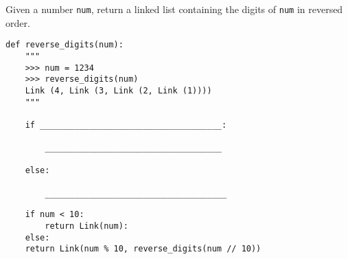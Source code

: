 \begin{blocksection}
\question Given a number \texttt{num}, return a linked list containing the digits of \texttt{num} in reversed order. 

\begin{lstlisting}
def reverse_digits(num):
    """
    >>> num = 1234
    >>> reverse_digits(num)
    Link (4, Link (3, Link (2, Link (1)))) 
    """

    if _____________________________________:
    
        ____________________________________
        
    else:
    
        _____________________________________
\end{lstlisting}
\begin{solution}[0.6in]
\begin{lstlisting}
    if num < 10:
        return Link(num):
    else:
 	return Link(num % 10, reverse_digits(num // 10))
\end{lstlisting}
\end{solution}
\end{blocksection}
